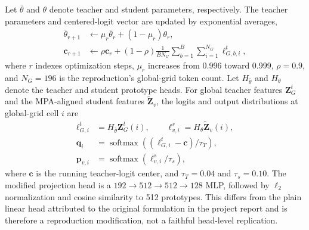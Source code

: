 \documentclass[conference]{IEEEtran}
\begin{document}
Let $\bar{\theta}$ and $\theta$ denote teacher and student parameters, respectively. The teacher parameters and centered-logit vector are updated by exponential averages,
\begin{align}
    \bar{\theta}_{r+1} &\leftarrow \mu_r\bar{\theta}_{r}+(1-\mu_r)\theta_r,\\
    \mathbf{c}_{r+1} &\leftarrow \rho\mathbf{c}_{r}+(1-\rho)\frac{1}{BN_G}\sum_{b=1}^{B}\sum_{i=1}^{N_G}\boldsymbol{\ell}^{t}_{G,b,i},
    \label{eq:teacher-ema}
\end{align}
where $r$ indexes optimization steps, $\mu_r$ increases from 0.996 toward 0.999, $\rho=0.9$, and $N_G=196$ is the reproduction's global-grid token count. Let $H_{\bar{\theta}}$ and $H_{\theta}$ denote the teacher and student prototype heads. For global teacher features $\mathbf{Z}^{t}_G$ and the MPA-aligned student features $\widetilde{\mathbf{Z}}_v$, the logits and output distributions at global-grid cell $i$ are
\begin{align}
    \boldsymbol{\ell}^{t}_{G,i} &= H_{\bar{\theta}}\mathbf{Z}^{t}_G(i),\qquad
    \boldsymbol{\ell}^{s}_{v,i} = H_{\theta}\widetilde{\mathbf{Z}}_v(i),\\
    \mathbf{q}_{i} &= \operatorname{softmax}\!\left((\boldsymbol{\ell}^{t}_{G,i}-\mathbf{c})/\tau_T\right),\\
    \mathbf{p}_{v,i} &= \operatorname{softmax}\!\left(\boldsymbol{\ell}^{s}_{v,i}/\tau_s\right),
    \label{eq:teacher-student-distributions}
\end{align}
where $\mathbf{c}$ is the running teacher-logit center, and $\tau_T=0.04$ and $\tau_s=0.10$. The modified projection head is a $192\rightarrow512\rightarrow512\rightarrow128$ MLP, followed by $\ell_2$ normalization and cosine similarity to 512 prototypes. This differs from the plain linear head attributed to the original formulation in the project report and is therefore a reproduction modification, not a faithful head-level replication.
\end{document}
